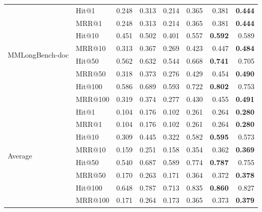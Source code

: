 \begin{table}[!t]
\begin{tabular*}{\textwidth}{@{\extracolsep{\fill}}llrrrrrr@{}}
\midrule
\multirow{8}{*}{MMLongBench-doc} & Hit@1 & 0.248 & 0.313 & 0.214 & 0.365 & 0.381 & \textbf{0.444} \\
 & MRR@1 & 0.248 & 0.313 & 0.214 & 0.365 & 0.381 & \textbf{0.444} \\
 & Hit@10 & 0.451 & 0.502 & 0.401 & 0.557 & \textbf{0.592} & 0.589 \\
 & MRR@10 & 0.313 & 0.367 & 0.269 & 0.423 & 0.447 & \textbf{0.484} \\
 & Hit@50 & 0.562 & 0.632 & 0.544 & 0.668 & \textbf{0.741} & 0.705 \\
 & MRR@50 & 0.318 & 0.373 & 0.276 & 0.429 & 0.454 & \textbf{0.490} \\
 & Hit@100 & 0.586 & 0.689 & 0.593 & 0.722 & \textbf{0.802} & 0.753 \\
 & MRR@100 & 0.319 & 0.374 & 0.277 & 0.430 & 0.455 & \textbf{0.491} \\
\midrule
\multirow{8}{*}{Average} & Hit@1 & 0.104 & 0.176 & 0.102 & 0.261 & 0.264 & \textbf{0.280} \\
 & MRR@1 & 0.104 & 0.176 & 0.102 & 0.261 & 0.264 & \textbf{0.280} \\
 & Hit@10 & 0.309 & 0.445 & 0.322 & 0.582 & \textbf{0.595} & 0.573 \\
 & MRR@10 & 0.159 & 0.251 & 0.158 & 0.354 & 0.362 & \textbf{0.369} \\
 & Hit@50 & 0.540 & 0.687 & 0.589 & 0.774 & \textbf{0.787} & 0.755 \\
 & MRR@50 & 0.170 & 0.263 & 0.171 & 0.364 & 0.372 & \textbf{0.378} \\
 & Hit@100 & 0.648 & 0.787 & 0.713 & 0.835 & \textbf{0.860} & 0.827 \\
 & MRR@100 & 0.171 & 0.264 & 0.173 & 0.365 & 0.373 & \textbf{0.379} \\
\bottomrule
\end{tabular*}
\end{table}
